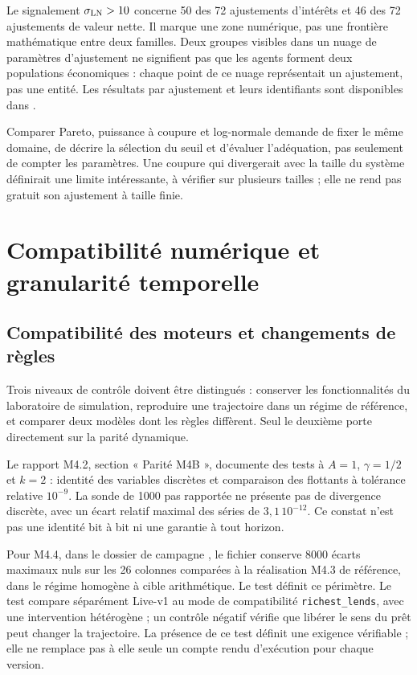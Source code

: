 Le signalement $\sigma_{\rm LN}>10$ concerne 50 des 72 ajustements
d'intérêts et 46 des 72 ajustements de valeur nette. Il marque une
zone numérique, pas une frontière mathématique entre deux familles.
Deux groupes visibles dans un nuage de paramètres d'ajustement ne
signifient pas que les agents forment deux populations économiques :
chaque point de ce nuage représentait un ajustement, pas une entité.
Les résultats par ajustement et leurs identifiants sont disponibles dans
.

Comparer Pareto, puissance à coupure et log-normale demande de
fixer le même domaine, de décrire la sélection du seuil et d'évaluer
l'adéquation, pas seulement de compter les paramètres. Une coupure
qui divergerait avec la taille du système définirait une limite
intéressante, à vérifier sur plusieurs tailles ; elle ne rend pas
gratuit son ajustement à taille finie.


\section{Compatibilité numérique et granularité temporelle}
\subsection{Compatibilité des moteurs et changements de règles}
\label{sec:compatibilite}
Trois niveaux de contrôle doivent être distingués : conserver les
fonctionnalités du laboratoire de simulation, reproduire une trajectoire
dans un régime de référence, et comparer deux modèles dont les règles
diffèrent. Seul le deuxième porte directement sur la parité dynamique.

Le rapport M4.2, section « Parité M4B », documente des tests à
$A=1$, $\gamma=1/2$ et $k=2$ : identité des variables discrètes
et comparaison des flottants à tolérance relative $10^{-9}$.
La sonde de 1000 pas rapportée ne présente pas de divergence discrète,
avec un écart relatif maximal des séries de $3{,}1\,10^{-12}$.
Ce constat n'est pas une identité bit à bit ni une garantie à tout horizon.

Pour M4.4, dans le dossier de campagne
, le fichier
conserve 8000 écarts maximaux nuls sur les 26 colonnes comparées à
la réalisation M4.3 de référence, dans le régime homogène à cible
arithmétique. Le test  définit ce
périmètre. Le test  compare
séparément Live-v1 au mode de compatibilité
\texttt{richest\_lends}, avec une intervention hétérogène ; un contrôle
négatif vérifie que libérer le sens du prêt peut changer la trajectoire.
La présence de ce test définit une exigence vérifiable ; elle ne remplace
pas à elle seule un compte rendu d'exécution pour chaque version.


